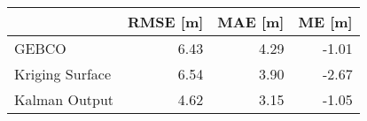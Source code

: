
\begin{tabular}{lrrr}
\toprule
 & RMSE [m] & MAE [m] & ME [m] \\
\midrule
GEBCO & 6.43 & 4.29 & -1.01 \\
Kriging Surface & 6.54 & 3.90 & -2.67 \\
Kalman Output & 4.62 & 3.15 & -1.05 \\
\bottomrule
\end{tabular}

